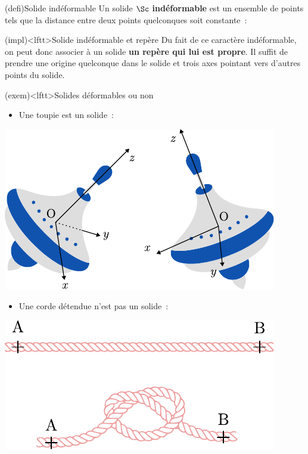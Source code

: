 \documentclass[../../main/main.tex]{subfiles}
\begin{document}
\begin{tcb*}(defi){Solide indéformable}
	Un solide $\Sc$ \textbf{indéformable} est un ensemble de points tels que la
	distance entre deux points quelconques soit constante~:
	\psw{
		\[
			\forall (\Mr_1,\Mr_2) \in ({\rm solide}), \quad {\rm M_1M_2} = \cte
		\]
	}
	\vspace{-15pt}
\end{tcb*}
\begin{tcb*}(impl)<lftt>{Solide indéformable et repère}
	Du fait de ce caractère indéformable, on peut donc associer à un solide
	\textbf{un repère qui lui est propre}. Il suffit de prendre une origine
	quelconque dans le solide et trois axes pointant vers d’autres points du
	solide.
\end{tcb*}
\begin{tcb*}(exem)<lftt>{Solides déformables ou non}
	\begin{isd}[sidebyside align=top]
		\begin{itemize}
			\item Une toupie est un solide~:
		\end{itemize}
		\begin{center}
			\includegraphics[width=\linewidth]{toup_indef}
		\end{center}
		\tcblower
		\begin{itemize}
			\item Une corde détendue n'est pas un solide~:
		\end{itemize}
		\begin{center}
			\includegraphics[width=\linewidth]{cord_def}
		\end{center}
	\end{isd}
\end{tcb*}
\end{document}
